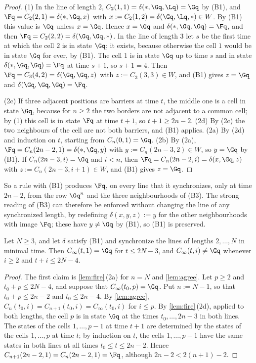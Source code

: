 \begin{proof}
(1) In the line of length $2$, $C_2(1,1)=\delta(\ast,\Gq,\Lq)=\Gq$ by (B1), and
$\Fq=C_2(2,1)=\delta(\ast,\Gq,x)$ with $x:=C_2(1,2)=\delta(\Gq,\Lq,\ast)\in W$. By
(B1) this value is $\Gq$ unless $x=\Gq$. Hence $x=\Gq$ and
$\delta(\ast,\Gq,\Gq)=\Fq$, and then $\Fq=C_2(2,2)=\delta(\Gq,\Gq,\ast)$. In the
line of length $3$ let $s$ be the first time at which the cell $2$ is in state
$\Gq$; it exists, because otherwise the cell $1$ would be in state $\Gq$ for
ever, by (B1). The cell $1$ is in state $\Gq$ up to time $s$ and in state
$\delta(\ast,\Gq,\Gq)=\Fq$ at time $s+1$, so $s+1=4$. Then
$\Fq=C_3(4,2)=\delta(\Gq,\Gq,z)$ with $z:=C_3(3,3)\in W$, and (B1) gives $z=\Gq$
and $\delta(\Gq,\Gq,\Gq)=\Fq$.

(2c) If three adjacent positions are barriers at time $t$, the middle one is a
cell in state $\Gq$, because for $n\ge2$ the two borders are not adjacent to a
common cell; by (1) this cell is in state $\Fq$ at time $t+1$, so
$t+1\ge2n-2$. (2d) By (2c) the two neighbours of the cell are not both
barriers, and (B1) applies. (2a) By (2d) and induction on $t$, starting from
$C_n(0,1)=\Gq$. (2b) By (2a), $\Fq=C_n(2n-2,1)=\delta(\ast,\Gq,y)$ with
$y:=C_n(2n-3,2)\in W$, so $y=\Gq$ by (B1). If $C_n(2n-3,i)=\Gq$ and $i<n$, then
$\Fq=C_n(2n-2,i)=\delta(x,\Gq,z)$ with $z:=C_n(2n-3,i+1)\in W$, and (B1) gives
$z=\Gq$.
\end{proof}

So a rule with (B1) produces $\Fq$, on every line that it synchronizes, only at
time $2n-2$, from the row $\Gq^n$ and the three neighbourhoods of (B3). The
strong reading of (B3) can therefore be enforced without changing the line of
any synchronized length, by redefining $\delta(x,y,z):=y$ for the other
neighbourhoods with image $\Fq$; these have $y\ne\Gq$ by (B1), so (B1) is
preserved.

\begin{lemma}[walls]\label{lem:wall}
Let $N\ge3$, and let $\delta$ satisfy \textup{(B1)} and synchronize the lines of
lengths $2,\dots,N$ in minimal time. Then $C_\infty(t,1)=\Gq$ for $t\le2N-3$, and
$C_\infty(t,i)\ne\Gq$ whenever $i\ge2$ and $t+i\le2N-4$.
\end{lemma}

\begin{proof}
The first claim is \cref{lem:fire}\,(2a) for $n=N$ and \cref{lem:agree}. Let
$p\ge2$ and $t_0+p\le2N-4$, and suppose that $C_\infty(t_0,p)=\Gq$. Put
$n:=N-1$, so that $t_0+p\le2n-2$ and $t_0\le2n-4$. By \cref{lem:agree},
$C_n(t_0,i)=C_{n+1}(t_0,i)=C_\infty(t_0,i)$ for $i\le p$. By
\cref{lem:fire}\,(2d), applied to both lengths, the cell $p$ is in state $\Gq$ at
the times $t_0,\dots,2n-3$ in both lines. The states of the cells
$1,\dots,p-1$ at time $t+1$ are determined by the states of the cells
$1,\dots,p$ at time $t$; by induction on $t$, the cells $1,\dots,p-1$ have the
same states in both lines at all times $t_0\le t\le2n-2$. Hence
$C_{n+1}(2n-2,1)=C_n(2n-2,1)=\Fq$, although $2n-2<2(n+1)-2$.
\end{proof}

